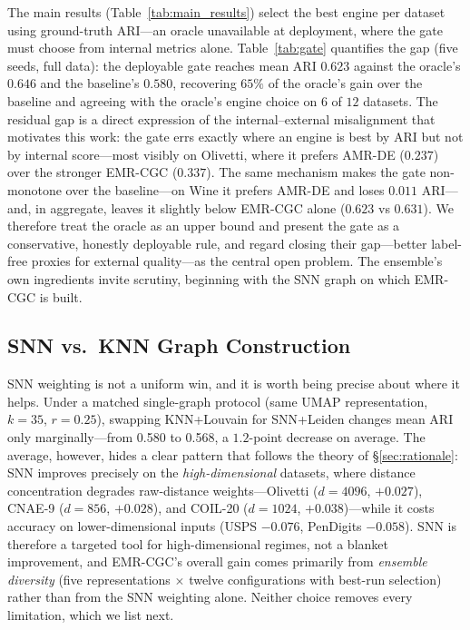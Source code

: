 \documentclass[journal]{IEEEtran}
\begin{document}
The main results (Table~\ref{tab:main_results}) select the best engine per dataset using ground-truth ARI---an oracle unavailable at deployment, where the gate must choose from internal metrics alone. Table~\ref{tab:gate} quantifies the gap (five seeds, full data): the deployable gate reaches mean ARI $0.623$ against the oracle's $0.646$ and the baseline's $0.580$, recovering $65\%$ of the oracle's gain over the baseline and agreeing with the oracle's engine choice on $6$ of $12$ datasets. The residual gap is a direct expression of the internal--external misalignment that motivates this work: the gate errs exactly where an engine is best by ARI but not by internal score---most visibly on Olivetti, where it prefers AMR-DE ($0.237$) over the stronger EMR-CGC ($0.337$). The same mechanism makes the gate non-monotone over the baseline---on Wine it prefers AMR-DE and loses $0.011$ ARI---and, in aggregate, leaves it slightly below EMR-CGC alone ($0.623$ vs $0.631$). We therefore treat the oracle as an upper bound and present the gate as a conservative, honestly deployable rule, and regard closing their gap---better label-free proxies for external quality---as the central open problem. The ensemble's own ingredients invite scrutiny, beginning with the SNN graph on which EMR-CGC is built.



\subsection{SNN vs.\ KNN Graph Construction}

SNN weighting is not a uniform win, and it is worth being precise about where it helps. Under a matched single-graph protocol (same UMAP representation, $k{=}35$, $r{=}0.25$), swapping KNN+Louvain for SNN+Leiden changes mean ARI only marginally---from 0.580 to 0.568, a $1.2$-point decrease on average. The average, however, hides a clear pattern that follows the theory of \S\ref{sec:rationale}: SNN improves precisely on the \emph{high-dimensional} datasets, where distance concentration degrades raw-distance weights---Olivetti ($d{=}4096$, $+0.027$), CNAE-9 ($d{=}856$, $+0.028$), and COIL-20 ($d{=}1024$, $+0.038$)---while it costs accuracy on lower-dimensional inputs (USPS $-0.076$, PenDigits $-0.058$). SNN is therefore a targeted tool for high-dimensional regimes, not a blanket improvement, and EMR-CGC's overall gain comes primarily from \emph{ensemble diversity} (five representations $\times$ twelve configurations with best-run selection) rather than from the SNN weighting alone. Neither choice removes every limitation, which we list next.
\end{document}
